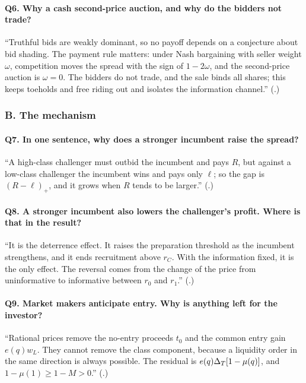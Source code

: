 \paragraph{Q6. Why a cash second-price auction, and why do the bidders not trade?}
``Truthful bids are weakly dominant, so no payoff depends on a conjecture about bid shading. The payment rule
matters: under Nash bargaining with seller weight \(\omega\), competition moves the spread with the sign of
\(1-2\omega\), and the second-price auction is \(\omega=0\). The bidders do not trade, and the sale binds all shares;
this keeps toeholds and free riding out and isolates the information channel.''
(.)

\subsubsection*{B. The mechanism}

\paragraph{Q7. In one sentence, why does a stronger incumbent raise the spread?}
``A high-class challenger must outbid the incumbent and pays \(R\), but against a low-class challenger the incumbent
wins and pays only \(\ell\); so the gap is \((R-\ell)_+\), and it grows when \(R\) tends to be larger.''
(.)

\paragraph{Q8. A stronger incumbent also lowers the challenger's profit. Where is that in the result?}
``It is the deterrence effect. It raises the preparation threshold as the incumbent strengthens, and it ends
recruitment above \(r_C\). With the information fixed, it is the only effect. The reversal comes from the change of the price from
uninformative to informative between \(r_0\) and \(r_1\).'' (.)

\paragraph{Q9. Market makers anticipate entry. Why is anything left for the investor?}
``Rational prices remove the no-entry proceeds \(t_0\) and the common entry gain \(e(q)w_L\). They cannot remove the
class component, because a liquidity order in the same direction is always possible. The residual is
\(e(q)\Delta_T[1-\mu(q)]\), and \(1-\mu(1)\ge1-M>0\).'' (.)

